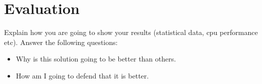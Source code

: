 
%
%

\section{Evaluation}

Explain how you are going to show your results (statistical data, cpu performance etc). Answer the following questions:
\begin{itemize}
  \item Why is this solution going to be better than others.
  \item How am I going to defend that it is better.
\end{itemize}
